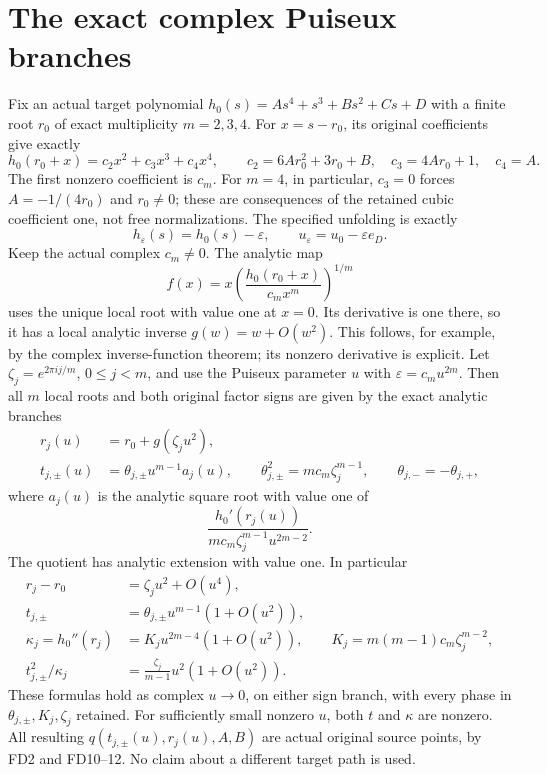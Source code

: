 \documentclass[11pt]{article}
\begin{document}
\section{The exact complex Puiseux branches}
Fix an actual target polynomial \(h_0(s)=As^4+s^3+Bs^2+Cs+D\)
with a finite root \(r_0\) of exact multiplicity \(m=2,3,4\).
For \(x=s-r_0\), its original coefficients give exactly
\[
 h_0(r_0+x)=c_2x^2+c_3x^3+c_4x^4,\qquad
 c_2=6Ar_0^2+3r_0+B,\quad c_3=4Ar_0+1,\quad c_4=A.
 \tag{FD9}
\]
The first nonzero coefficient is \(c_m\).
For \(m=4\), in particular, \(c_3=0\) forces
\(A=-1/(4r_0)\) and \(r_0\ne0\); these are consequences
of the retained cubic coefficient one, not free normalizations.
The specified unfolding is exactly
\[
 h_\varepsilon(s)=h_0(s)-\varepsilon,\qquad
 u_\varepsilon=u_0-\varepsilon e_D.
 \tag{FD10}
\]
Keep the actual complex \(c_m\ne0\). The analytic map
\[
 f(x)=x\left(\frac{h_0(r_0+x)}{c_mx^m}\right)^{1/m}
 \tag{FD11}
\]
uses the unique local root with value one at \(x=0\).
Its derivative is one there, so it has a local analytic inverse
\(g(w)=w+O(w^2)\). This follows, for example, by the complex
inverse-function theorem; its nonzero derivative is explicit.
Let \(\zeta_j=e^{2\pi ij/m}\), \(0\le j<m\), and use the
Puiseux parameter \(u\) with \(\varepsilon=c_mu^{2m}\).
Then all \(m\) local roots and both original factor signs are
given by the exact analytic branches
\[
\begin{aligned}
 r_j(u)&=r_0+g(\zeta_j u^2),\\
 t_{j,\pm}(u)&=\theta_{j,\pm}u^{m-1}a_j(u),\qquad
 \theta_{j,\pm}^2=mc_m\zeta_j^{m-1},\qquad
 \theta_{j,-}=-\theta_{j,+},
\end{aligned}\tag{FD12}
\]
where \(a_j(u)\) is the analytic square root with value one of
\[
 \frac{h_0'(r_j(u))}
                  {mc_m\zeta_j^{m-1}u^{2m-2}}.
\]
The quotient has analytic extension with value one. In particular
\[
\begin{aligned}
 r_j-r_0&=\zeta_ju^2+O(u^4),\\
 t_{j,\pm}&=\theta_{j,\pm}u^{m-1}(1+O(u^2)),\\
 \kappa_j=h_0''(r_j)&=K_j u^{2m-4}(1+O(u^2)),\qquad
 K_j=m(m-1)c_m\zeta_j^{m-2},\\
 t_{j,\pm}^2/\kappa_j&=\frac{\zeta_j}{m-1}u^2(1+O(u^2)).
\end{aligned}\tag{FD13}
\]
These formulas hold as complex \(u\to0\), on either sign
branch, with every phase in \(\theta_{j,\pm},K_j,\zeta_j\)
retained. For sufficiently small nonzero \(u\), both \(t\)
and \(\kappa\) are nonzero. All resulting
\(q(t_{j,\pm}(u),r_j(u),A,B)\) are actual original source
points, by FD2 and FD10--12. No claim about a different
target path is used.
\end{document}
